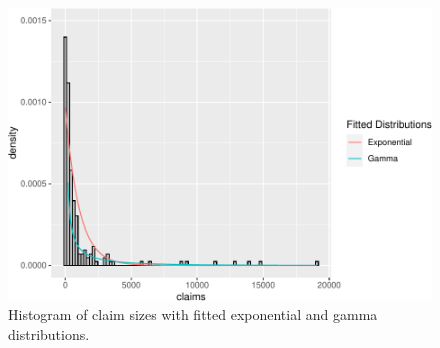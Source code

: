 \documentclass[landscape, 20pt]{extreport}
\theoremstyle{definition}
\theoremstyle{definition}
\theoremstyle{definition}
\theoremstyle{definition}
\theoremstyle{remark}
\begin{document}
\begin{figure}
\centering
\includegraphics{FittedExpGamma-1.pdf}
\caption{\label{fig:FittedExpGamma}Histogram of claim sizes with fitted exponential and gamma distributions.}
\end{figure}
\end{document}
